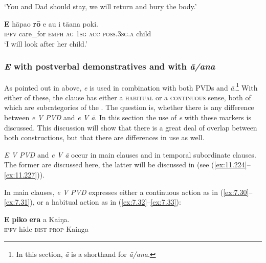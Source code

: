 \glt 
‘You and Dad should stay, we will return and bury the body.’ \textstyleExampleref{[Ley-4-08.017]}
\z

\ea\label{ex:7.29}
\gll \textbf{E} hāpa{\ꞌ}o \textbf{rō} e au i tā{\ꞌ}ana poki. \\
\textsc{ipfv} care\_for \textsc{emph} \textsc{ag} \textsc{1sg} \textsc{acc} \textsc{poss.3sg.a} child \\

\glt 
‘I will look after her child.’ \textstyleExampleref{[R229.081]} 
\z

\subsubsection{\textit{E} with postverbal demonstratives and with \textit{{\ꞌ}ā/{\ꞌ}ana}}\label{sec:7.2.5.4}
As pointed out in  above, \textit{e} is used in combination with both PVDs and \textit{{\ꞌ}ā}.\footnote{\label{fn:326}In this section, \textit{{\ꞌ}ā} is a shorthand for \textit{{\ꞌ}ā/{\ꞌ}ana}.} With either of these, the clause has either a \textsc{habitual} or a \textsc{continuous} sense, both of which are subcategories of the . The question is, whether there is any difference between \textit{e V PVD} and \textit{e V {\ꞌ}ā}. In this section the use of \textit{e} with these markers is discussed. This discussion will show that there is a great deal of overlap between both constructions, but that there are differences in use as well.

\textit{E V PVD} and \textit{e V {\ꞌ}ā} occur in main clauses and in temporal subordinate clauses. The former are discussed here, the latter will be discussed in  (see (\ref{ex:11.224}–\ref{ex:11.227})).

In main clauses, \textit{e V PVD} expresses either a continuous action as in (\ref{ex:7.30}–\ref{ex:7.31}), or a habitual action as in (\ref{ex:7.32}–\ref{ex:7.33}):

\ea\label{ex:7.30}
\gll \textbf{E} \textbf{piko} \textbf{era} a Kaiŋa. \\
\textsc{ipfv} hide \textsc{dist} \textsc{prop} Kainga \\

